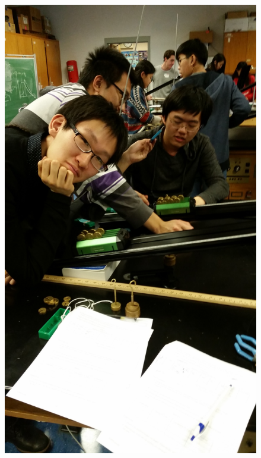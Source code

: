 \documentclass[11pt, titlepage]{article}
\begin{document}
\begin{figure}[p]
\centering
\hspace*{-10.5cm}
\includegraphics[scale=0.15, angle=270]{lab7.jpg}
\vspace*{19cm}
\end{figure}
\end{document}
